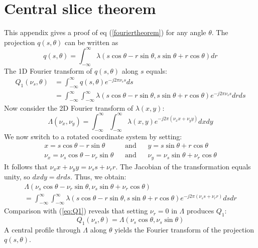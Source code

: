 \documentclass[11pt,oneside]{book}
\begin{document}
\section{Central slice theorem} \label{app:cs}
This appendix gives a proof of eq (\ref{fouriertheorem}) for any angle
$\theta$. The projection $q(s,\theta)$ can be written as
\begin{equation}
  q(s, \theta) = \int_{-\infty}^{\infty} \lambda(s \cos\theta - r\sin\theta, 
                                s \sin\theta + r\cos\theta) dr
\end{equation}
The 1D Fourier transform of $q(s,\theta)$ along $s$ equals:
\begin{align}
  Q_1(\nu_s, \theta) &= \int_{-\infty}^{\infty} q(s, \theta) e^{-j2\pi \nu_s s} ds \nonumber \\
  &= \int_{-\infty}^{\infty}\int_{-\infty}^{\infty}\lambda(s\cos\theta - r\sin\theta, 
                          s\sin\theta + r\cos\theta)e^{-j2\pi \nu_s s} dr ds
      \label{eq:Q1}
\end{align}
Now consider the 2D Fourier transform of $\lambda(x,y)$:
\begin{equation}
  \Lambda(\nu_x, \nu_y) = \int_{-\infty}^{\infty} \int_{-\infty}^{\infty} \lambda(x,y) 
       e^{-j2\pi (\nu_x x + \nu_y y)} dx dy
\end{equation}
We now switch to a rotated coordinate system by setting:
\begin{align}
   x = s \cos\theta - r\sin\theta \;\;\;&\mbox{and}& \;\;\;
   y = s\sin\theta + r\cos\theta\\
   \nu_x = \nu_s \cos\theta - \nu_r\sin\theta \;\;\;&\mbox{and}& \;\;\;
   \nu_y = \nu_s\sin\theta + \nu_r\cos\theta
\end{align}
It follows that $\nu_x x + \nu_y y = \nu_s s + \nu_r r$. The Jacobian
of the transformation equals unity, so $dx dy = dr ds$. Thus, we obtain:
\begin{multline}
\Lambda(\nu_s \cos\theta - \nu_r\sin\theta, 
      \nu_s\sin\theta + \nu_r\cos\theta) \\
   = \int_{-\infty}^{\infty} \int_{-\infty}^{\infty} 
     \lambda(s \cos\theta - r\sin\theta, s\sin\theta + r\cos\theta) 
       e^{-j2\pi (\nu_s s + \nu_r r)} ds dr
\end{multline}
Comparison with (\ref{eq:Q1}) reveals that setting $\nu_r = 0$ in
$\Lambda$ produces $Q_1$:
\begin{equation}
  Q_1(\nu_s, \theta) = \Lambda(\nu_s\cos\theta, \nu_s\sin\theta )
\end{equation}
A central profile through $\Lambda$ along $\theta$ yields the Fourier
transform of the projection $q(s,\theta)$.
\end{document}

